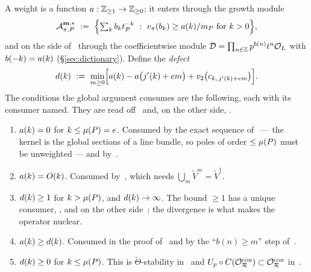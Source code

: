 A weight is a function $a : \mathbb{Z}_{\ge 1} \to \mathbb{Z}_{\ge 0}$; it enters through
the growth module
\begin{equation}
\label{eq:growth-module}
  \mathcal{A}^{\mathbf{m},*}_{\pi,P} \ := \ \Bigl\{ \textstyle\sum_k b_k t_P^{-k}
      \ : \ v_{\pi}(b_k) \ge a(k)/m_P \text{ for } k > 0 \Bigr\},
\end{equation}
and on the side of~\cite{kramermiller2020abelian} through the
coefficientwise module $\mathcal{D} = \prod_{n \in \mathbb{Z}} p^{b(n)} t^n \mathcal{O}_L$ with
$b(-k) = a(k)$ (\S\ref{sec:dictionary}). Define the \emph{defect}
\begin{equation}
\label{eq:defect}
  d(k) \ := \ \min_{m \ge 0}
    \Bigl[ a(k) - a\bigl(j'(k)+em\bigr)
           + v_2\bigl(c_{k,\,j'(k)+em}\bigr) \Bigr] .
\end{equation}
The conditions the global argument consumes are the following, each with its
consumer named. They are read off~\cite[\S\S6.1.2, 6.2, Corollaries 6.7,
6.8, Lemma 7.11]{kramermillerupton2021newton} and, on the other side,
\cite[\S7.2, Lemma 6.12, eqs.\ (21), (22)]{kramermiller2020abelian}.

\begin{enumerate}[label=\textup{(A\arabic*)},leftmargin=*,itemsep=2pt]
\item\label{A1} $a(k) = 0$ for $k \le \mu(P) = e$. Consumed by the exact
  sequence of~\cite[\S6.2]{kramermillerupton2021newton} --- the kernel is the global
  sections of a line bundle, so poles of order $\le \mu(P)$ must be
  unweighted --- and by~\cite[eq.\ (21)]{kramermiller2020abelian}.
\item\label{A2} $a(k) = O(k)$. Consumed by~\cite[Corollary 6.7]{kramermillerupton2021newton}, which needs $\bigcup_m
  \widetilde{V}^m = \widetilde{V}^{\dagger}$.
\item\label{A3} $d(k) \ge 1$ for $k > \mu(P)$, and $d(k) \to \infty$.
  The bound $\ge 1$ has a unique consumer,
  \cite[Lemma 7.11]{kramermillerupton2021newton}, and on the other side~\cite[\S7.2, case (II)]{kramermiller2020abelian}; the divergence is what
  makes the operator nuclear.
\item\label{A4} $a(k) \ge d(k)$. Consumed in the proof of~\cite[Proposition 6.6(2)]{kramermillerupton2021newton} and by the ``$b(n) \ge m$''
  step of~\cite[\S7.2, case (II)]{kramermiller2020abelian}.
\item\label{A5} $d(k) \ge 0$ for $k \le \mu(P)$. This is
  $\widetilde{\Theta}$-stability in~\cite[Corollary 6.8]{kramermillerupton2021newton} and $U_p \circ C(\mathcal{O}_{\mathcal{R}}^{\mathrm{con}}) \subset \mathcal{O}_{\mathcal{R}}^{\mathrm{con}}$ in~\cite[eq.\ (22)]{kramermiller2020abelian}.
\end{enumerate}

